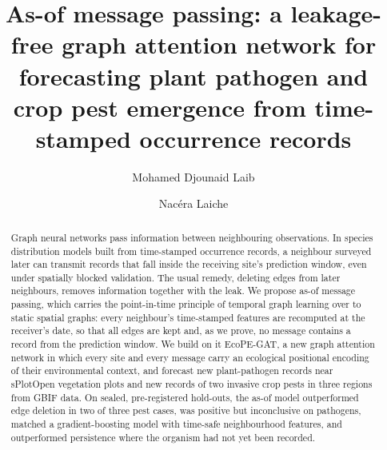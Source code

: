 \documentclass[a4paper,fleqn]{cas-sc}
\begin{document}
\let\WriteBookmarks\relax
\def\floatpagepagefraction{1}
\def\textpagefraction{.001}



\title[mode=title]{As-of message passing: a leakage-free graph attention network for forecasting plant pathogen and crop pest emergence from time-stamped occurrence records}

\author[1]{Mohamed Djounaid Laib}

\author[1,2]{Nacéra Laiche}
\cormark[1]




\begin{abstract}
Graph neural networks pass information between neighbouring observations. In species distribution models built from time-stamped occurrence records, a neighbour surveyed later can transmit records that fall inside the receiving site's prediction window, even under spatially blocked validation. The usual remedy, deleting edges from later neighbours, removes information together with the leak. We propose as-of message passing, which carries the point-in-time principle of temporal graph learning over to static spatial graphs: every neighbour's time-stamped features are recomputed at the receiver's date, so that all edges are kept and, as we prove, no message contains a record from the prediction window. We build on it EcoPE-GAT, a new graph attention network in which every site and every message carry an ecological positional encoding of their environmental context, and forecast new plant-pathogen records near \nEligible{} sPlotOpen vegetation plots and new records of two invasive crop pests in three regions from GBIF data. On sealed, pre-registered hold-outs, the as-of model outperformed edge deletion in two of three pest cases, was positive but inconclusive on pathogens, matched a gradient-boosting model with time-safe neighbourhood features, and outperformed persistence where the organism had not yet been recorded.
\end{abstract}
\end{document}
